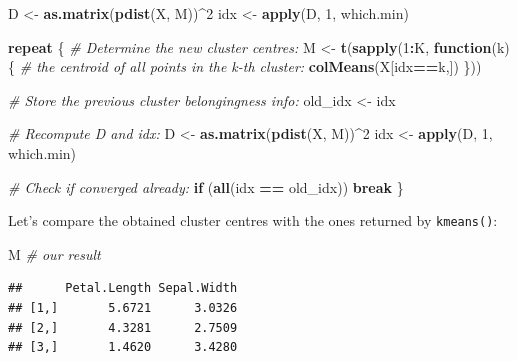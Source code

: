 \documentclass[10pt,b5paper,krantz1]{krantz}
\newenvironment{Shaded}{\begin{snugshade}}{\end{snugshade}}
\newcommand{\CommentTok}[1]{\textcolor[rgb]{0.37,0.37,0.37}{\textit{#1}}}
\newcommand{\ControlFlowTok}[1]{\textcolor[rgb]{0.27,0.27,0.27}{\textbf{#1}}}
\newcommand{\DecValTok}[1]{\textcolor[rgb]{0.06,0.06,0.06}{#1}}
\newcommand{\KeywordTok}[1]{\textcolor[rgb]{0.27,0.27,0.27}{\textbf{#1}}}
\newcommand{\NormalTok}[1]{#1}
\newcommand{\OperatorTok}[1]{\textcolor[rgb]{0.43,0.43,0.43}{\textbf{#1}}}
\newcommand{\StringTok}[1]{\textcolor[rgb]{0.5,0.5,0.5}{#1}}
\begin{document}
\begin{Shaded}
\begin{Highlighting}[]
\NormalTok{D <-}\StringTok{ }\KeywordTok{as.matrix}\NormalTok{(}\KeywordTok{pdist}\NormalTok{(X, M))}\OperatorTok{^}\DecValTok{2}
\NormalTok{idx <-}\StringTok{ }\KeywordTok{apply}\NormalTok{(D, }\DecValTok{1}\NormalTok{, which.min)}
\end{Highlighting}
\end{Shaded}

\begin{Shaded}
\begin{Highlighting}[]
\ControlFlowTok{repeat}\NormalTok{ \{}
    \CommentTok{# Determine the new cluster centres:}
\NormalTok{    M <-}\StringTok{ }\KeywordTok{t}\NormalTok{(}\KeywordTok{sapply}\NormalTok{(}\DecValTok{1}\OperatorTok{:}\NormalTok{K, }\ControlFlowTok{function}\NormalTok{(k) \{}
        \CommentTok{# the centroid of all points in the k-th cluster:}
        \KeywordTok{colMeans}\NormalTok{(X[idx}\OperatorTok{==}\NormalTok{k,])}
\NormalTok{    \}))}

    \CommentTok{# Store the previous cluster belongingness info:}
\NormalTok{    old_idx <-}\StringTok{ }\NormalTok{idx}

    \CommentTok{# Recompute D and idx:}
\NormalTok{    D <-}\StringTok{ }\KeywordTok{as.matrix}\NormalTok{(}\KeywordTok{pdist}\NormalTok{(X, M))}\OperatorTok{^}\DecValTok{2}
\NormalTok{    idx <-}\StringTok{ }\KeywordTok{apply}\NormalTok{(D, }\DecValTok{1}\NormalTok{, which.min)}

    \CommentTok{# Check if converged already:}
    \ControlFlowTok{if}\NormalTok{ (}\KeywordTok{all}\NormalTok{(idx }\OperatorTok{==}\StringTok{ }\NormalTok{old_idx)) }\ControlFlowTok{break}
\NormalTok{\}}
\end{Highlighting}
\end{Shaded}

Let's compare the obtained cluster centres with the ones returned
by \texttt{kmeans()}:

\begin{Shaded}
\begin{Highlighting}[]
\NormalTok{M }\CommentTok{# our result}
\end{Highlighting}
\end{Shaded}

\begin{verbatim}
##      Petal.Length Sepal.Width
## [1,]       5.6721      3.0326
## [2,]       4.3281      2.7509
## [3,]       1.4620      3.4280
\end{verbatim}
\end{document}
